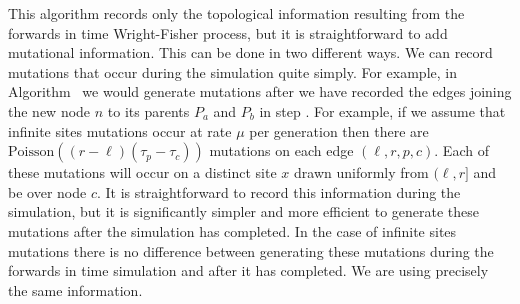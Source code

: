 \documentclass{article}
\begin{document}
This algorithm records only the topological information resulting from the
forwards in time Wright-Fisher process, but it is straightforward to add
mutational information. This can be done in two different ways.
We can record mutations that occur during the simulation quite simply.
For example, in Algorithm~ we would generate mutations after
we have recorded the edges joining the new node $n$ to its parents
$P_a$ and $P_b$ in step .
For example, if we assume that infinite sites mutations
occur at rate $\mu$ per generation then there are $\mbox{Poisson}\left((r - \ell)(\tau_p
- \tau_c)\right)$ mutations on each edge $(\ell, r, p, c)$. Each of these mutations
will occur on a distinct site $x$ drawn uniformly from $(\ell, r]$ and be over node $c$.
It is straightforward to record this information during the simulation, but it
is significantly simpler and more efficient to generate these mutations
after the simulation has completed. In the case of infinite sites mutations
there is no difference between generating these mutations during the forwards
in time simulation and after it has completed. We are using precisely the same
information.
\end{document}
